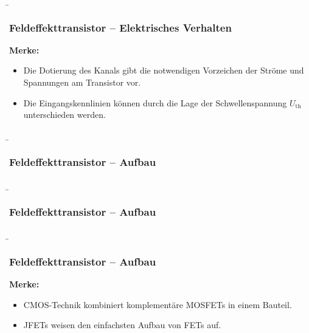 \begin{frame}
    \b{\frametitle{Feldeffekttransistor -- Elektrisches Verhalten}
        \textbf{Merke:}
        \begin{itemize}
            \item Die Dotierung des Kanals gibt die notwendigen Vorzeichen der Ströme und Spannungen am Transistor vor.
            \item Die Eingangskennlinien können durch die Lage der Schwellenspannung $U_\mathrm{th}$ unterschieden werden.
        \end{itemize}
        }
\end{frame}

\begin{frame}
    \b{ \frametitle{Feldeffekttransistor -- Aufbau}
        \begin{figure}[H]
            \centering
            
        \end{figure}
    }
\end{frame}

\begin{frame}
    \b{ \frametitle{Feldeffekttransistor -- Aufbau}
        \begin{figure}[H]
            \centering
            
        \end{figure}
    }
\end{frame}

\begin{frame}
    \b{\frametitle{Feldeffekttransistor -- Aufbau}
        \textbf{Merke:}
        \begin{itemize}
            \item CMOS-Technik kombiniert komplementäre MOSFETs in einem Bauteil.
            \item JFETs weisen den einfachsten Aufbau von FETs auf.
        \end{itemize}
        }
\end{frame}

